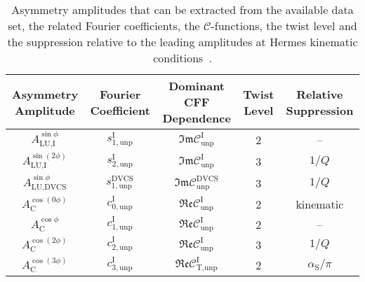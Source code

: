 \begin{table}
\begin{center}
\resizebox{\textwidth}{!} {
\begin{tabular}{|c|c|c|c|c|}
\hline
Asymmetry Amplitude& Fourier Coefficient& Dominant CFF Dependence & Twist Level & Relative Suppression   \\ 
\hline
\hline
$A_{\textrm{LU,I}}^{\sin\phi}$ & $s_{1,\textrm{unp}}^{\textrm{I}}$  &
$\mathfrak{Im}\mathcal{C}_{\textrm{unp}}^{\textrm{I}}$
&  2 & --\\
\hline
$A_{\textrm{LU,I}}^{\sin(2\phi)}$ & $s_{2,\textrm{unp}}^{\textrm{I}}$ 
&
$\mathfrak{Im}\mathcal{C}_{\textrm{unp}}^{\textrm{I}}$
&  3 & $1/Q$\\
\hline
\hline
$A_{\textrm{LU,DVCS}}^{\sin\phi}$ & $s_{1, \textrm{unp}}^{\textrm{DVCS}}$ &
$\mathfrak{Im}\mathcal{C}_{\textrm{unp}}^{\textrm{DVCS}}$ &  3 & $1/Q$ \\
\hline
\hline
$A_{\textrm{C}}^{\cos(0\phi)}$ & $c_{0,\textrm{unp}}^{\textrm{I}}$  &
$\mathfrak{Re}\mathcal{C}_{\textrm{unp}}^{\textrm{I}}$ & 2&kinematic
\\
\hline
$A_{\textrm{C}}^{\cos\phi}$ & $c_{1,\textrm{unp}}^{\textrm{I}}$  &
$\mathfrak{Re}\mathcal{C}_{\textrm{unp}}^{\textrm{I}}$ & 2 & --
\\
\hline
$A_{\textrm{C}}^{\cos(2\phi)}$ & $c_{2,\textrm{unp}}^{\textrm{I}}$ &
$\mathfrak{Re}\mathcal{C}_{\textrm{unp}}^{\textrm{I}}$ & 3 & $1/Q$ \\
\hline
$A_{\textrm{C}}^{\cos(3\phi)}$ & $c_{3,\textrm{unp}}^{\textrm{I}}$ &
$\mathfrak{Re}\mathcal{C}_{\textrm{T,unp}}^{\textrm{I}}$ &  2 & $\alpha_{\textrm{S}}/\pi$ \\
\hline
 \end{tabular}
}
\caption{Asymmetry amplitudes that can
be extracted from the available data set, the related Fourier coefficients,
 the $\mathcal{C}$-functions, the twist level and the suppression
 relative to the leading amplitudes at H{\sc ermes} kinematic conditions~\cite{Bel02b}. }
\label{tab_amplitudes}
\end{center}
\end{table}
 
